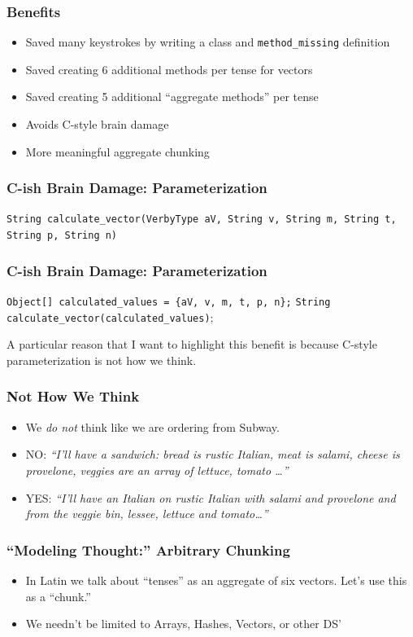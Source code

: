 \documentclass[slidestop,compress,mathserif]{beamer}
\begin{document}
\begin{frame}
	\frametitle{Benefits}
	\begin{itemize}
		\item Saved many keystrokes by writing a class and \texttt{method\_missing} definition
		\pause
		\item Saved creating 6 additional methods per tense for vectors
		\pause
		\item Saved creating 5 additional ``aggregate methods'' per tense
		\pause
		\item Avoids C-style brain damage
		\pause
		\item More meaningful aggregate chunking
	\end{itemize}
\end{frame}

\begin{frame}
	\frametitle{C-ish Brain Damage:  Parameterization}	
 	\texttt{String calculate\_vector(VerbyType aV, String v, String m, String t, String p, String n)}
\end{frame}

\begin{frame}
	\frametitle{C-ish Brain Damage:  Parameterization}	
	\texttt{Object[] calculated\_values = \{aV, v, m, t, p, n\};} 
	\texttt{String calculate\_vector(calculated\_values)}; 
\end{frame}
\note
{A particular reason that I want to highlight this benefit is because C-style
parameterization is not how we think.
}

\begin{frame}
	\frametitle{Not How We Think}
	\begin{itemize}
		\item We \emph{do not} think like we are ordering from Subway.
		\pause
		\item NO:  \emph{``I'll have a sandwich:  bread is rustic Italian, meat is salami, cheese is provelone, veggies are an array of lettuce, tomato \ldots''}
		\pause
		\item YES:  \emph{``I'll have an Italian on rustic Italian with salami and provelone and from the veggie bin, lessee, lettuce and tomato\ldots''}
	\end{itemize}
	
\end{frame}


\begin{frame}
	\frametitle{ ``Modeling Thought:''  Arbitrary Chunking}
	\begin{itemize}
		\item In Latin we talk about ``tenses'' as an aggregate of six vectors.  Let's use this as a ``chunk.''
		\pause
		\item We needn't be limited to Arrays, Hashes, Vectors, or other DS'
	\end{itemize}
\end{frame}
\end{document}
